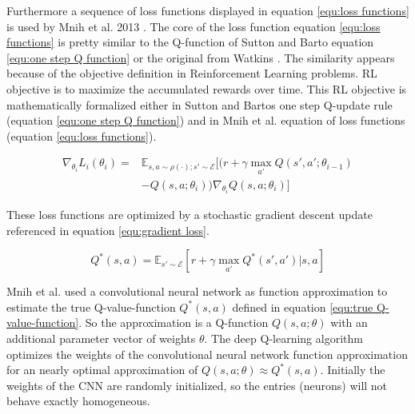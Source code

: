 \documentclass[conference]{IEEEtran}
\begin{document}
Furthermore a sequence of loss functions displayed in equation \ref{equ:loss functions} is used by Mnih et al. 2013 \cite{mnih-atari-2013}. The core of the loss function equation \ref{equ:loss functions} is pretty similar to the Q-function of Sutton and Barto \cite{sutton_barto_98} equation \ref{equ:one step Q function} or the original from Watkins \cite{Watkins_1992}. The similarity appears because of the objective definition in Reinforcement Learning problems. RL objective is to maximize the accumulated rewards over time. This RL objective is mathematically formalized either in Sutton and Bartos one step Q-update rule (equation \ref{equ:one step Q function}) and in Mnih et al. equation of loss functions (equation \ref{equ:loss functions}).

\begin{equation} \label{equ:gradient loss}
\begin{split}
\nabla_{\theta_i} L_i (\theta_i) = & \mathbb{E}_{s,a \sim \rho(\cdot);s'\sim \mathcal{E}} [(r + \gamma \max_{a'} Q(s',a';\theta_{i-1}) \\
 & - Q(s,a;\theta_i)) \nabla_{\theta_i} Q(s,a;\theta_i)]
\end{split}
\end{equation}

These loss functions are optimized by a stochastic gradient descent update referenced in equation \ref{equ:gradient loss}. 

\begin{equation} \label{equ:true Q-value-function}
Q^*(s,a) = \mathbb{E}_{s' \sim \mathcal{E}} [r + \gamma \max_{a'} Q^* (s',a') |s,a]
\end{equation}

Mnih et al. used a convolutional neural network as function approximation to estimate the true Q-value-function $Q^*(s,a)$ defined in equation \ref{equ:true Q-value-function}. So the approximation is a Q-function $Q(s,a;\theta)$ with an additional parameter vector of weights $\theta$. The deep Q-learning algorithm optimizes the weights of the convolutional neural network function approximation for an nearly optimal approximation of $Q(s,a;\theta) \approx Q^*(s,a)$. Initially the weights of the CNN are randomly initialized, so the entries (neurons) will not behave exactly homogeneous.
\end{document}
